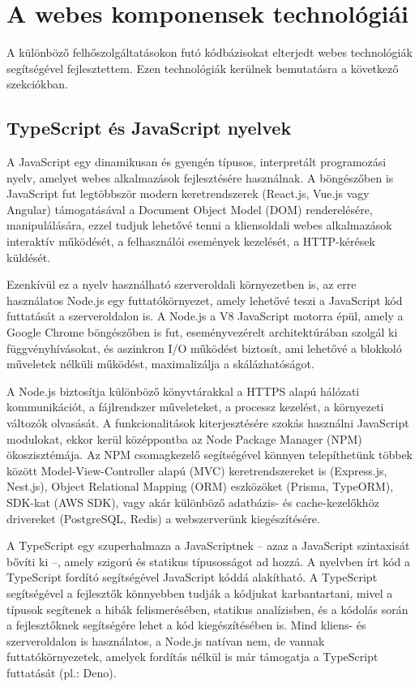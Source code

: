 \section{A webes komponensek technológiái}

A különböző felhőszolgáltatásokon futó kódbázisokat elterjedt webes technológiák segítségével fejlesztettem. Ezen technológiák kerülnek bemutatásra a következő szekciókban.

\subsection{TypeScript és JavaScript nyelvek}

A JavaScript egy dinamikusan és gyengén típusos, interpretált programozási nyelv, amelyet webes alkalmazások fejlesztésére használnak. A böngészőben is JavaScript fut legtöbbször modern keretrendszerek (React.js, Vue.js vagy Angular) támogatásával a Document Object Model (DOM) renderelésére, manipulálására, ezzel tudjuk lehetővé tenni a kliensoldali webes alkalmazások interaktív működését, a felhasználói események kezelését, a HTTP-kérések küldését.

Ezenkívül ez a nyelv használható szerveroldali környezetben is, az erre használatos Node.js egy futtatókörnyezet, amely lehetővé teszi a JavaScript kód futtatását a szerveroldalon is. A Node.js a V8 JavaScript motorra épül, amely a Google Chrome böngészőben is fut, eseményvezérelt architektúrában szolgál ki függvényhívásokat, és aszinkron I/O működést biztosít, ami lehetővé a blokkoló műveletek nélküli működést, maximalizálja a skálázhatóságot.

A Node.js biztosítja különböző könyvtárakkal a HTTPS alapú hálózati kommunikációt, a fájlrendszer műveleteket, a processz kezelést, a környezeti változók olvasását. A funkcionalitások kiterjesztésére szokás használni JavaScript modulokat, ekkor kerül középpontba az Node Package Manager (NPM) ökoszisztémája. Az NPM csomagkezelő segítségével könnyen telepíthetünk többek között Model-View-Controller alapú (MVC) keretrendszereket is (Express.js, Nest.js), Object Relational Mapping (ORM) eszközöket (Prisma, TypeORM), SDK-kat (AWS SDK), vagy akár különböző adatbázis- és cache-kezelőkhöz drivereket (PostgreSQL, Redis) a webszerverünk kiegészítésére.

A TypeScript egy szuperhalmaza a JavaScriptnek -- azaz a JavaScript szintaxisát bővíti ki --, amely szigorú és statikus típusosságot ad hozzá. A nyelvben írt kód a TypeScript fordító segítségével JavaScript kóddá alakítható. A TypeScript segítségével a fejlesztők könnyebben tudják a kódjukat karbantartani, mivel a típusok segítenek a hibák felismerésében, statikus analízisben, és a kódolás során a fejlesztőknek segítségére lehet a kód kiegészítésében is. Mind kliens- és szerveroldalon is használatos, a Node.js natívan nem, de vannak futtatókörnyezetek, amelyek fordítás nélkül is már támogatja a TypeScript futtatását (pl.: Deno).

